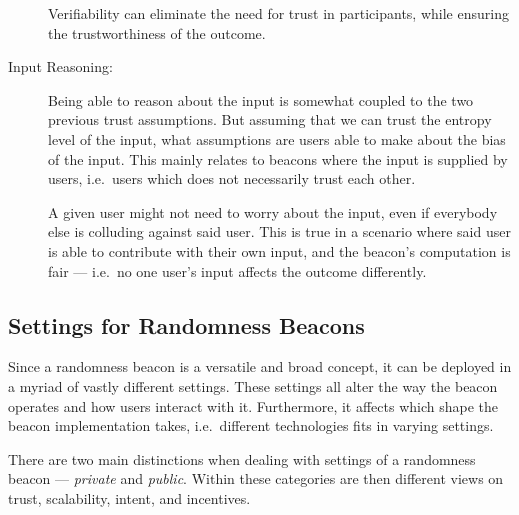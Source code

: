 \begin{description}
        Verifiability can eliminate the need for trust in participants, while ensuring the trustworthiness of the outcome.

    \item [Input Reasoning:]
        Being able to reason about the input is somewhat coupled to the two previous trust assumptions.
        But assuming that we can trust the entropy level of the input, what assumptions are users able to make about the bias of the input.
        This mainly relates to beacons where the input is supplied by users, i.e.\ users which does not necessarily trust each other.

        A given user might not need to worry about the input, even if everybody else is colluding against said user.
        This is true in a scenario where said user is able to contribute with their own input, and the beacon's computation is fair
        --- i.e.\ no one user's input affects the outcome differently.

\end{description}

\subsection{Settings for Randomness Beacons}
Since a randomness beacon is a versatile and broad concept, it can be deployed in a myriad of vastly different settings.
These settings all alter the way the beacon operates and how users interact with it.
Furthermore, it affects which shape the beacon implementation takes, i.e.\ different technologies fits in varying settings.

There are two main distinctions when dealing with settings of a randomness beacon --- \emph{private} and \emph{public}.
Within these categories are then different views on trust, scalability, intent, and incentives.

